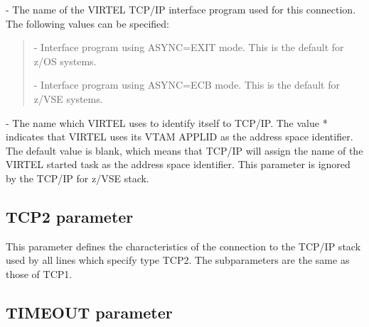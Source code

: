 \documentclass[letterpaper,10pt,english]{sphinxmanual}
\begin{document}
 - The name of the VIRTEL TCP/IP interface program used for this connection. The following values can be specified:
\begin{quote}

 - Interface program using ASYNC=EXIT mode. This is the default for z/OS systems.

 - Interface program using ASYNC=ECB mode. This is the default for z/VSE systems.
\end{quote}

 - The name which VIRTEL uses to identify itself to TCP/IP. The value * indicates that VIRTEL uses its VTAM APPLID as the address space identifier. The default value is blank, which means that TCP/IP will assign the name of the VIRTEL started task as the address space identifier. This parameter is ignored by the TCP/IP for z/VSE stack.


\subsection{TCP2 parameter}
\label{\detokenize{Installation_Guide:tcp2-parameter}}
\begin{sphinxVerbatim}[commandchars=\\\{\}]
    
\PYG{p}{[}\PYG{p}{]}\PYG{p}{[}\PYG{p}{]}\PYG{p}{[}\PYG{p}{]}\PYG{p}{[}\PYG{p}{]}\PYG{p}{[}\PYG{p}{]}
\end{sphinxVerbatim}

This parameter defines the characteristics of the connection to the TCP/IP stack used by all lines which specify type TCP2. The subparameters are the same as those of TCP1.

\ignorespaces 

\subsection{TIMEOUT parameter}
\label{\detokenize{Installation_Guide:timeout-parameter}}\label{\detokenize{Installation_Guide:index-123}}
\begin{sphinxVerbatim}[commandchars=\\\{\}]
 
\end{sphinxVerbatim}
\end{document}
